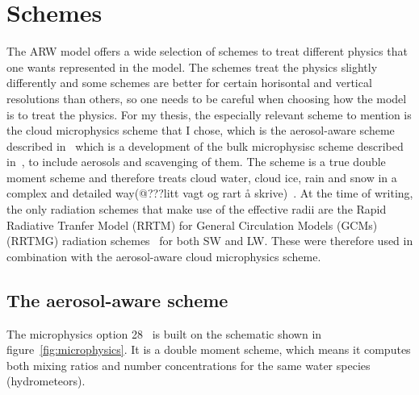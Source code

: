 \section{Schemes}
\label{sec:schemes}
The ARW model offers a wide selection of schemes to treat different physics that one wants represented in the model. The schemes treat the physics slightly differently and some schemes are better for certain horisontal and vertical resolutions than others, so one needs to be careful when choosing how the model is to treat the physics. For my thesis, the especially relevant scheme to mention is the cloud microphysics scheme that I chose, which is the aerosol-aware scheme described in~\cite{Thompson2014} which is a development of the bulk microphysisc scheme described in~\cite{Thompson2008}, to include aerosols and scavenging of them. The scheme is a true double moment scheme and therefore treats cloud water, cloud ice, rain and snow in a complex and detailed way(@???litt vagt og rart å skrive)~\cite{Thompson2014}. At the time of writing, the only radiation schemes that make use of the effective radii are the Rapid Radiative Tranfer Model (RRTM) for General Circulation Models (GCMs) (RRTMG) radiation schemes~\cite{@authorsRRTMG} for both SW and LW. These were therefore used in combination with the aerosol-aware cloud microphysics scheme.

\subsection{The aerosol-aware scheme}
The microphysics option 28~\citep{Thompson2014} is built on the schematic shown in figure~\ref{fig:microphysics}. It is a double moment scheme, which means it computes both mixing ratios and number concentrations for the same water species (hydrometeors). 

